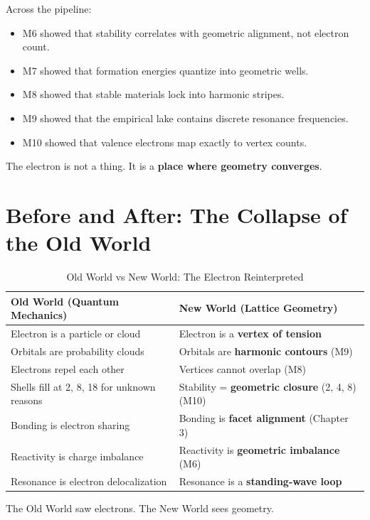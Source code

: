 \documentclass[11pt, letterpaper, openany]{book}
\begin{document}
Across the pipeline:

\begin{itemize}
    \item M6 showed that stability correlates with geometric alignment, not electron count.
    \item M7 showed that formation energies quantize into geometric wells.
    \item M8 showed that stable materials lock into harmonic stripes.
    \item M9 showed that the empirical lake contains discrete resonance frequencies.
    \item M10 showed that valence electrons map exactly to vertex counts.
\end{itemize}

The electron is not a thing.  
It is a \textbf{place where geometry converges}.

\section{Before and After: The Collapse of the Old World}

\begin{table}[H]
\centering
\caption{Old World vs New World: The Electron Reinterpreted}
\begin{tabular}{|p{6cm}|p{6cm}|}
\hline
\textbf{Old World (Quantum Mechanics)} & \textbf{New World (Lattice Geometry)} \\
\hline
Electron is a particle or cloud & Electron is a \textbf{vertex of tension} \\
\hline
Orbitals are probability clouds & Orbitals are \textbf{harmonic contours} (M9) \\
\hline
Electrons repel each other & Vertices cannot overlap (M8) \\
\hline
Shells fill at 2, 8, 18 for unknown reasons & Stability = \textbf{geometric closure} (2, 4, 8) (M10) \\
\hline
Bonding is electron sharing & Bonding is \textbf{facet alignment} (Chapter 3) \\
\hline
Reactivity is charge imbalance & Reactivity is \textbf{geometric imbalance} (M6) \\
\hline
Resonance is electron delocalization & Resonance is a \textbf{standing-wave loop} \\
\hline
\end{tabular}
\end{table}

The Old World saw electrons.  
The New World sees geometry.
\end{document}
